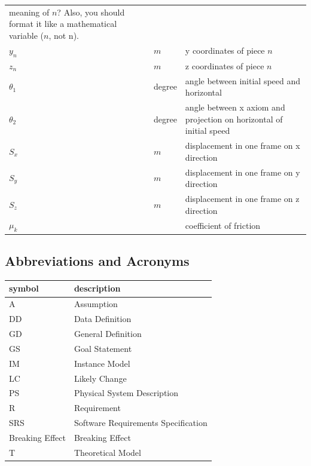 \documentclass[12pt]{article}
\newcommand{\progname}{Breaking Effect} %
\begin{document}
\begin{longtable*}{l l p{12cm}}
{			meaning of $n$?  Also, you should format it like a mathematical variable ($n$,
			not n).}
		\\
		$y_{n}$ & $m$ & y coordinates of piece $n$
		\\
		$z_{n}$ & $m$ & z coordinates of piece $n$
		\\
		$\theta_{1}$ & degree & angle between initial speed and horizontal
		\\
		$\theta_{2}$ & degree & angle between
		x axiom and projection on horizontal of initial speed
		\\
		$S_{x}$ & $m$ & displacement in one frame on x direction 
		\\
		$S_{y}$ & $m$ & displacement in one frame on y direction
		\\
		$S_{z}$ & $m$ & displacement in one frame on z direction
		\\
		$\mu_k$ &  & coefficient of friction
		\\
		\bottomrule
	\end{longtable*}
	
	\subsection{Abbreviations and Acronyms}
	
	\renewcommand{\arraystretch}{1.2}
	\begin{tabular}{l l} 
		\toprule		
		\textbf{symbol} & \textbf{description}\\
		\midrule 
		A & Assumption\\
		DD & Data Definition\\
		GD & General Definition\\
		GS & Goal Statement\\
		IM & Instance Model\\
		LC & Likely Change\\
		PS & Physical System Description\\
		R & Requirement\\
		SRS & Software Requirements Specification\\
		\progname{} & Breaking Effect\\
		T & Theoretical Model\\
		\bottomrule
	\end{tabular}\\
	
	\newpage
	
	\tableofcontents
	
\end{document}
